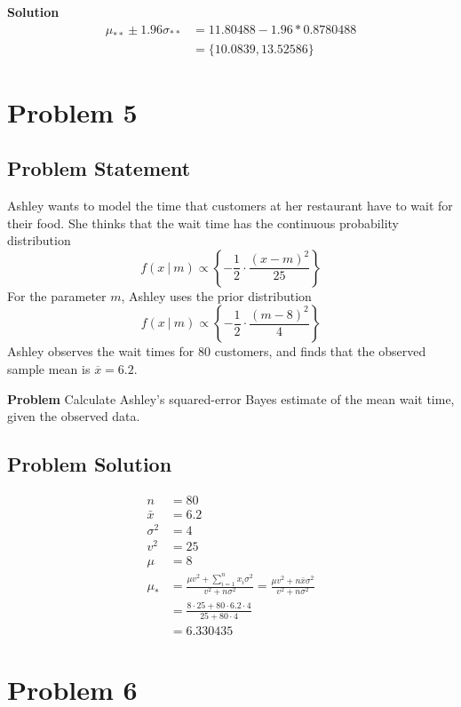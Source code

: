 \documentclass[12pt]{article}
\theoremstyle{definition}
\begin{document}
\bigskip
\noindent
{\bf Solution} 
\begin{align*}
\mu_{**} \pm 1.96\sigma_{**} &= 11.80488 - 1.96 * 0.8780488\\
&= \{10.0839, 13.52586\}
\end{align*}


\newpage
\section*{Problem 5}

\subsection*{Problem Statement}

Ashley wants to model the time that customers at her restaurant have to wait for their food. She thinks that the wait time has the continuous probability distribution
$$
f(x\ |\ m) \propto \left \{ - \frac{1}{2} \cdot \frac{ (x - m)^2}{25} \right \}
$$
For the parameter $m$, Ashley uses the prior distribution
$$
f(x\ |\ m) \propto \left \{ - \frac{1}{2} \cdot \frac{ (m - 8)^2}{4} \right \}
$$
Ashley observes the wait times for 80 customers, and finds that the observed sample mean is $\overline{x} = 6.2$.

\bigskip
\noindent
{\bf Problem} Calculate Ashley's squared-error Bayes estimate of the mean wait time, given the observed data.


\subsection*{Problem Solution}
\begin{align*}
n &= 80\\
\bar{x} &= 6.2\\
\sigma^2 &= 4\\
v^2 &= 25\\
\mu &= 8\\
\mu_{*} &= \frac{\mu v^2 + \sum_{i=1}^n x_i \sigma^2}{v^2 + n\sigma^2} = \frac{\mu v^2 + n \bar{x}\sigma^2}{v^2 + n\sigma^2}\\
&= \frac{8 \cdot 25 + 80 \cdot 6.2 \cdot 4}{25 + 80 \cdot 4}\\
&= 6.330435
\end{align*}



\newpage
\section*{Problem 6}
\end{document}
